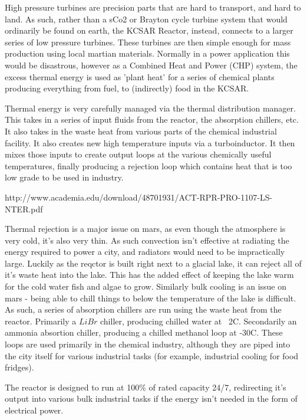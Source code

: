 \documentclass[10pt]{article}
\begin{document}
High pressure turbines are precision parts that are hard to transport, and hard to land. As such, rather than a sCo2 or Brayton cycle turbine system that would ordinarily be found on earth, the KCSAR Reactor, instead, connects to a larger series of low pressure turbines. These turbines are then simple enough for mass production using local martian materials. Normally in a power application this would be disastrous, however as a Combined Heat and Power (CHP) system, the excess thermal energy is used as 'plant heat' for a series of chemical plants producing everything from fuel, to (indirectly) food in the KCSAR.

Thermal energy is very carefully managed via the thermal distribution manager. This takes in a series of input fluids from the reactor, the absorption chillers, etc. It also takes in the waste heat from various parts of the chemical industrial facility. It also creates new high temperature inputs via a turboinductor. It then mixes those inputs to create output loops at the various chemically useful temperatures, finally producing a rejection loop which contains heat that is too low grade to be used in industry.

http://www.academia.edu/download/48701931/ACT-RPR-PRO-1107-LS-NTER.pdf

Thermal rejection is a major issue on mars, as even though the atmosphere is very cold, it's also very thin. As such convection isn't effective at radiating the energy required to power a city, and radiators would need to be impractically large. Luckily as the reqctor is built right next to a glacial lake, it can reject all of it's waste heat into the lake. This has the added effect of keeping the lake warm for the cold water fish and algae to grow. Similarly bulk cooling is an issue on mars - being able to chill things to below the temperature of the lake is difficult. As such, a series of absorption chillers are run using the waste heat from the reactor. Primarily a $LiBr$ chiller, producing chilled water at ~2C. Secondarily an ammonia absortion chiller, producing a chilled methanol loop at -30C. These loops are used primarily in the chemical industry, although they are piped into the city itself for various industrial tasks (for example, industrial cooling for food fridges).

The reactor is designed to run at 100\% of rated capacity 24/7, redirecting it's output into various bulk industrial tasks if the energy isn't needed in the form of electrical power.
\end{document}
